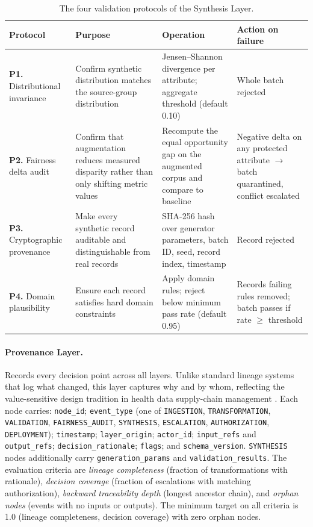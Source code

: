 \documentclass[11pt]{article}
\begin{document}
\begin{table}[h]
\centering
\small
\caption{The four validation protocols of the Synthesis Layer.}
\label{tab:protocols}
\begin{tabularx}{\textwidth}{lXXX}
\toprule
\textbf{Protocol} & \textbf{Purpose} & \textbf{Operation} & \textbf{Action on failure} \\
\midrule
\textbf{P1.} Distributional invariance & Confirm synthetic distribution matches the source-group distribution & Jensen--Shannon divergence per attribute; aggregate threshold (default 0.10) & Whole batch rejected \\[2pt]
\textbf{P2.} Fairness delta audit & Confirm that augmentation reduces measured disparity rather than only shifting metric values & Recompute the equal opportunity gap on the augmented corpus and compare to baseline & Negative delta on any protected attribute $\rightarrow$ batch quarantined, conflict escalated \\[2pt]
\textbf{P3.} Cryptographic provenance & Make every synthetic record auditable and distinguishable from real records & SHA-256 hash over generator parameters, batch ID, seed, record index, timestamp & Record rejected \\[2pt]
\textbf{P4.} Domain plausibility & Ensure each record satisfies hard domain constraints & Apply domain rules; reject below minimum pass rate (default 0.95) & Records failing rules removed; batch passes if rate $\geq$ threshold \\
\bottomrule
\end{tabularx}
\end{table}

\paragraph{Provenance Layer.} Records every decision point across all layers. Unlike standard lineage systems that log what changed, this layer captures why and by whom, reflecting the value-sensitive design tradition in health data supply-chain management \cite{Nebeker2025}. Each node carries: \texttt{node\_id}; \texttt{event\_type} (one of \texttt{INGESTION}, \texttt{TRANSFORMATION}, \texttt{VALIDATION}, \texttt{FAIRNESS\_AUDIT}, \texttt{SYNTHESIS}, \texttt{ESCALATION}, \texttt{AUTHORIZATION}, \texttt{DEPLOYMENT}); \texttt{timestamp}; \texttt{layer\_origin}; \texttt{actor\_id}; \texttt{input\_refs} and \texttt{output\_refs}; \texttt{decision\_rationale}; \texttt{flags}; and \texttt{schema\_version}. \texttt{SYNTHESIS} nodes additionally carry \texttt{generation\_params} and \texttt{validation\_results}. The evaluation criteria are \emph{lineage completeness} (fraction of transformations with rationale), \emph{decision coverage} (fraction of escalations with matching authorization), \emph{backward traceability depth} (longest ancestor chain), and \emph{orphan nodes} (events with no inputs or outputs). The minimum target on all criteria is 1.0 (lineage completeness, decision coverage) with zero orphan nodes.
\end{document}
